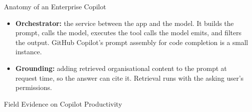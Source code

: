 \begin{frame}{Anatomy of an Enterprise Copilot}
\begin{itemize}
    \item[\textcolor{red}{$\blacktriangleright$}] \textbf{Orchestrator:} the service between the app and the model. It builds the prompt, calls the model, executes the tool calls the model emits, and filters the output. GitHub Copilot's prompt assembly for code completion is a small instance.
    \item[\textcolor{red}{$\blacktriangleright$}] \textbf{Grounding:} adding retrieved organisational content to the prompt at request time, so the answer can cite it. Retrieval runs with the asking user's permissions.
  \end{itemize}
\end{frame}

\begin{frame}{Field Evidence on Copilot Productivity}


\end{frame}
